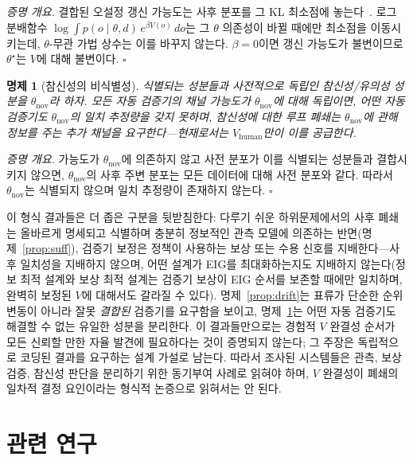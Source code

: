 \documentclass[11pt]{article}
\newtheorem{proposition}{명제}
\begin{document}
\noindent\emph{증명 개요.} 결합된 오설정 갱신 가능도는 사후 분포를 그 KL 최소점에 놓는다~\citep{berk1966}. 로그 분배함수 $\log\!\int p(o\mid\theta,d)\,e^{\beta V(o)}\,do$는 그 $\theta$ 의존성이 바뀔 때에만 최소점을 이동시키는데, $\theta$-무관 가법 상수는 이를 바꾸지 않는다. $\beta=0$이면 갱신 가능도가 불변이므로 $\theta^\star$는 $V$에 대해 불변이다. $\square$

\begin{proposition}[참신성의 비식별성]
\label{prop:novelty}
식별되는 성분들과 사전적으로 독립인 참신성/유의성 성분을 $\theta_{\mathrm{nov}}$라 하자. 모든 자동 검증기의 채널 가능도가 $\theta_{\mathrm{nov}}$에 대해 독립이면, 어떤 자동 검증기도 $\theta_{\mathrm{nov}}$의 일치 추정량을 갖지 못하며, 참신성에 대한 루프 폐쇄는 $\theta_{\mathrm{nov}}$에 관해 정보를 주는 추가 채널을 요구한다---현재로서는 $V_{\mathrm{human}}$만이 이를 공급한다.
\end{proposition}

\noindent\emph{증명 개요.} 가능도가 $\theta_{\mathrm{nov}}$에 의존하지 않고 사전 분포가 이를 식별되는 성분들과 결합시키지 않으면, $\theta_{\mathrm{nov}}$의 사후 주변 분포는 모든 데이터에 대해 사전 분포와 같다. 따라서 $\theta_{\mathrm{nov}}$는 식별되지 않으며 일치 추정량이 존재하지 않는다. $\square$

이 형식 결과들은 더 좁은 구분을 뒷받침한다: 다루기 쉬운 하위문제에서의 사후 폐쇄는 올바르게 명세되고 식별하며 충분히 정보적인 관측 모델에 의존하는 반면(명제~\ref{prop:suff}), 검증기 보정은 정책이 사용하는 보상 또는 수용 신호를 지배한다---사후 일치성을 지배하지 않으며, 어떤 설계가 EIG를 최대화하는지도 지배하지 않는다(정보 최적 설계와 보상 최적 설계는 검증기 보상이 EIG 순서를 보존할 때에만 일치하며, 완벽히 보정된 $V$에 대해서도 갈라질 수 있다). 명제~\ref{prop:drift}는 표류가 단순한 순위 변동이 아니라 잘못 \emph{결합된} 검증기를 요구함을 보이고, 명제~\ref{prop:novelty}는 어떤 자동 검증기도 해결할 수 없는 유일한 성분을 분리한다. 이 결과들만으로는 경험적 $V$ 완결성 순서가 모든 신뢰할 만한 자율 발견에 필요하다는 것이 증명되지 않는다; 그 주장은 독립적으로 코딩된 결과를 요구하는 설계 가설로 남는다. 따라서 조사된 시스템들은 관측, 보상 검증, 참신성 판단을 분리하기 위한 동기부여 사례로 읽혀야 하며, $V$ 완결성이 폐쇄의 일차적 결정 요인이라는 형식적 논증으로 읽혀서는 안 된다.

\section{관련 연구}
\label{sec:related}
\end{document}
